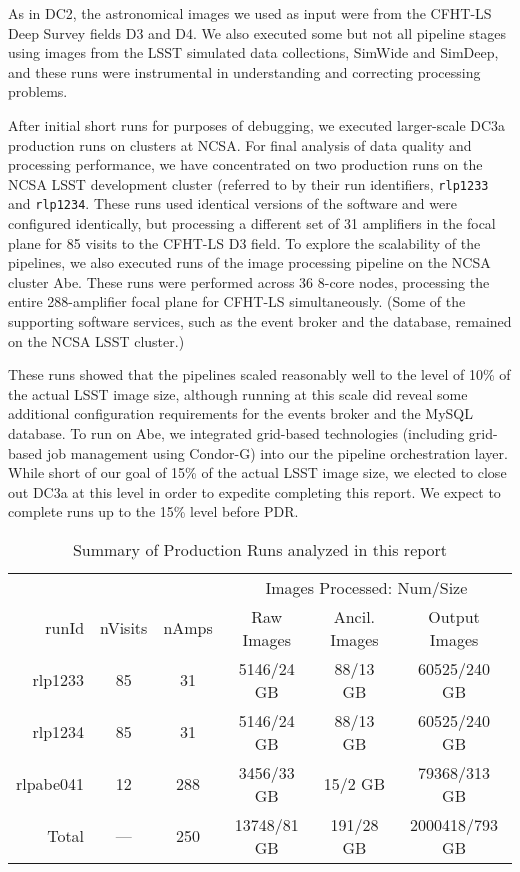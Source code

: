 As in DC2, the astronomical images we used as input were from the CFHT-LS
Deep Survey fields D3 and D4.  We also executed some but not all pipeline 
stages using images from the LSST simulated data collections, SimWide and
SimDeep, and these runs were instrumental in understanding and
correcting processing problems.

After initial short runs for purposes of debugging, 
we executed larger-scale DC3a production runs on clusters at
NCSA.  For final analysis of data quality and processing performance,
we have concentrated on two production runs on the NCSA LSST
development cluster (referred to by their run
identifiers, \texttt{rlp1233} and \texttt{rlp1234}. These runs used
identical versions of the software and were configured identically, but
processing a different set of 31 amplifiers in the focal plane for 85
visits to the CFHT-LS D3 field.  To explore the scalability of
the pipelines, we also executed runs of the image processing pipeline
on the NCSA cluster Abe.  These runs were performed across 36 8-core
nodes, processing the entire 288-amplifier focal plane for CFHT-LS
simultaneously.  (Some of the supporting software services, such as
the event broker and the database, remained on the NCSA LSST cluster.)

These runs showed that the pipelines scaled reasonably well to the
level of 10\% of the actual LSST image size, although running at this scale did reveal some additional
configuration requirements for the events broker and the MySQL
database.  To run on Abe, we integrated grid-based technologies
(including grid-based job management using Condor-G) into our the
pipeline orchestration layer.  While short of our goal of 15\% of the actual LSST image size,
we elected to close out DC3a at this level in order to expedite completing this report.
We expect to complete runs up to the 15\% level before PDR.

\begin{table}[ht]
\centering
\caption{Summary of Production Runs analyzed in this report
\label{tbl:runsummary}}
\vspace{\baselineskip}
\begin{tabular}{rccccc}
\hline\hline
          &         &       & \multicolumn{3}{c}{Images Processed: Num/Size} \\
runId     & nVisits & nAmps & Raw Images & Ancil. Images & Output Images \\ \hline
rlp1233   & 85      & 31  & 5146/24 GB    & 88/13 GB       & 60525/240 GB \\ 
rlp1234   & 85      & 31  & 5146/24 GB    & 88/13 GB       & 60525/240 GB \\ 
rlpabe041 & 12      & 288 & 3456/33 GB    & 15/2 GB        & 79368/313 GB \\ \hline
Total     & ---     & 250 & 13748/81 GB   & 191/28 GB      & 2000418/793 GB \\ \hline
\end{tabular}
\end{table}

